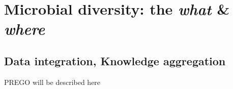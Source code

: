 \chapter{Microbial diversity: the \textit{what} \& \textit{where}}
\label{cha:3}


\section{Data integration, Knowledge aggregation}
PREGO will be described here

